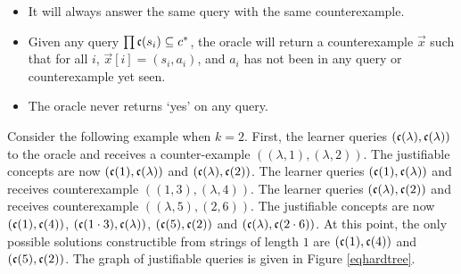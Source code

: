 \begin{itemize}
\item It will always answer the same query with the same counterexample.  
\item Given any query $\prod \mathfrak{c}(s_i) \subseteq c^*$, the oracle will return a counterexample $\vec{x}$ such that for all $i$, $\vec{x}[i] = (s_i, a_i)$, and $a_i$ has not been in any query or counterexample yet seen.
\item The oracle never returns `yes' on any query. 
\end{itemize}


\begin{example}
\label{eqhardex}
Consider the following example when $k = 2$. 
First, the learner queries $(\mathfrak{c}(\lambda), \mathfrak{c}(\lambda))$ to the oracle and receives a counter-example $((\lambda, 1), (\lambda, 2))$. 
The justifiable concepts are now $(\mathfrak{c}(1), \mathfrak{c}(\lambda))$ and $(\mathfrak{c}(\lambda), \mathfrak{c}(2))$. 
The learner queries $(\mathfrak{c}(1), \mathfrak{c}(\lambda))$ and receives counterexample  $((1, 3), (\lambda, 4))$. 
 The learner queries $(\mathfrak{c}(\lambda), \mathfrak{c}(2))$ and receives counterexample $((\lambda, 5), (2, 6))$.
The justifiable concepts are now  $(\mathfrak{c}(1), \mathfrak{c}(4))$, $(\mathfrak{c}(1 \cdot 3), \mathfrak{c}(\lambda))$, $(\mathfrak{c}(5), \mathfrak{c}(2))$ and $(\mathfrak{c}(\lambda), \mathfrak{c}(2 \cdot 6))$.  
At this point, the only possible solutions constructible from strings of length $1$ are $(\mathfrak{c}(1), \mathfrak{c}(4))$ and $(\mathfrak{c}(5), \mathfrak{c}(2))$. 
The graph of justifiable queries is given in Figure \ref{eqhardtree}.
\end{example}


